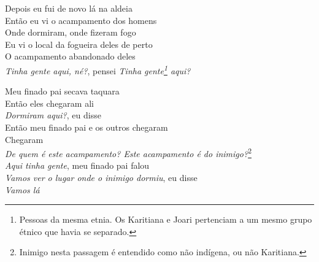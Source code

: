 \bigskip

\begin{linenumbers}\begingroup\raggedright
 
\noindent   Depois eu fui de novo lá na aldeia\\
  Então eu vi o acampamento dos homens\\
  Onde dormiram, onde fizeram fogo\\
  Eu vi o local da fogueira deles de perto\\
  O acampamento abandonado deles\\
  \emph{Tinha gente aqui, né?}, pensei \emph{Tinha gente\footnote{Pessoas da
   mesma etnia. Os Karitiana e Joari pertenciam a um mesmo grupo étnico
   que havia se separado.} aqui?}

\end{linenumbers}\endgroup

\bigskip

\begin{linenumbers}\begingroup\raggedright
 
\noindent   Meu finado pai secava taquara\\
  Então eles chegaram ali\\
  \emph{Dormiram aqui?}, eu disse\\
  Então meu finado pai e os outros chegaram\\
  Chegaram\\
  \emph{De quem é este acampamento? Este acampamento é do inimigo?}\footnote{Inimigo nesta passagem é entendido como não indígena, ou não Karitiana.}\\
  \emph{Aqui tinha gente}, meu finado pai falou\\
  \emph{Vamos ver o lugar onde o inimigo dormiu}, eu disse\\
  \emph{Vamos lá}
 
\end{linenumbers}\endgroup

